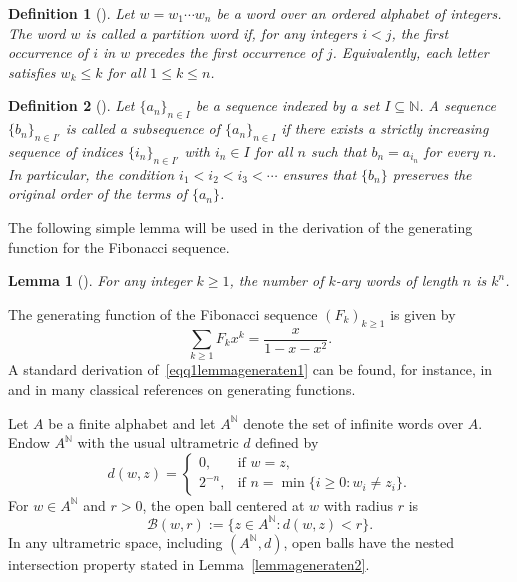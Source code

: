 \documentclass[12pt, a4paper]{article}
\newtheorem{lemma}[theorem]{Lemma}
\newtheorem{definition}{Definition}
\begin{document}
\begin{definition}[\cite{Heubach2009}]\label{defpren1}
Let $w = w_1 \cdots w_n$ be a word over an ordered alphabet of integers. The word $w$ is called a \emph{partition word} if, for any integers $i<j$, the first occurrence of $i$ in $w$ precedes the first occurrence of $j$. Equivalently, each letter satisfies $w_k \le k$ for all $1 \le k \le n$.
\end{definition}

\begin{definition}[\cite{Elzinga2008}]\label{defpren2}
Let $\{a_n\}_{n \in I}$ be a sequence indexed by a set $I \subseteq \mathbb{N}$. A sequence $\{b_n\}_{n \in I'}$ is called a \emph{subsequence} of $\{a_n\}_{n \in I}$ if there exists a strictly increasing sequence of indices $\{i_n\}_{n \in I'}$ with $i_n \in I$ for all $n$ such that $b_n = a_{i_n}$ for every $n$. In particular, the condition $i_1 < i_2 < i_3 < \cdots$ ensures that $\{b_n\}$ preserves the original order of the terms of $\{a_n\}$.
\end{definition}

The following simple lemma will be used in the derivation of the generating function for the Fibonacci sequence.

\begin{lemma}[\cite{Heubach2009}]\label{lemmageneraten1}
For any integer $k \ge 1$, the number of $k$-ary words of length $n$ is $k^n$.
\end{lemma}

The generating function of the Fibonacci sequence $(F_k)_{k \ge 1}$ is given by
\begin{equation}\label{eqq1lemmageneraten1}
\sum_{k \ge 1} F_k x^k = \frac{x}{1 - x - x^2}.
\end{equation}
A standard derivation of~\eqref{eqq1lemmageneraten1} can be found, for instance, in~\cite{Abdullah082025} and in many classical references on generating functions.

Let $A$ be a finite alphabet and let $A^{\mathbb{N}}$ denote the set of infinite words over $A$. Endow $A^{\mathbb{N}}$ with the usual ultrametric $d$ defined by
\[
d(w,z) =
\begin{cases}
0, & \text{if } w = z,\\
2^{-n}, & \text{if } n = \min\{ i \ge 0 : w_i \ne z_i\}.
\end{cases}
\]
For $w \in A^{\mathbb{N}}$ and $r > 0$, the open ball centered at $w$ with radius $r$ is
\[
\mathcal{B}(w,r) := \{ z \in A^{\mathbb{N}} : d(w,z) < r \}.
\]
In any ultrametric space, including $(A^{\mathbb{N}},d)$, open balls have the nested intersection property stated in Lemma~\ref{lemmageneraten2}.
\end{document}
